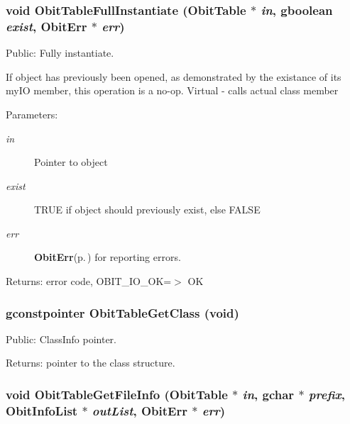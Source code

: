 \subsubsection{\setlength{\rightskip}{0pt plus 5cm}void Obit\-Table\-Full\-Instantiate ({\bf Obit\-Table} $\ast$ {\em in}, gboolean {\em exist}, {\bf Obit\-Err} $\ast$ {\em err})}\label{ObitTable_8c_a24}


Public: Fully instantiate. 

If object has previously been opened, as demonstrated by the existance of its my\-IO member, this operation is a no-op. Virtual - calls actual class member \begin{Desc}
\item[Parameters:]
\begin{description}
\item[{\em in}]Pointer to object \item[{\em exist}]TRUE if object should previously exist, else FALSE \item[{\em err}]{\bf Obit\-Err}{\rm (p.\,\pageref{structObitErr})} for reporting errors. \end{description}
\end{Desc}
\begin{Desc}
\item[Returns:]error code, OBIT\_\-IO\_\-OK=$>$ OK \end{Desc}
\subsubsection{\setlength{\rightskip}{0pt plus 5cm}gconstpointer Obit\-Table\-Get\-Class (void)}\label{ObitTable_8c_a17}


Public: Class\-Info pointer. 

\begin{Desc}
\item[Returns:]pointer to the class structure. \end{Desc}
\subsubsection{\setlength{\rightskip}{0pt plus 5cm}void Obit\-Table\-Get\-File\-Info ({\bf Obit\-Table} $\ast$ {\em in}, gchar $\ast$ {\em prefix}, {\bf Obit\-Info\-List} $\ast$ {\em out\-List}, {\bf Obit\-Err} $\ast$ {\em err})}\label{ObitTable_8c_a35}


